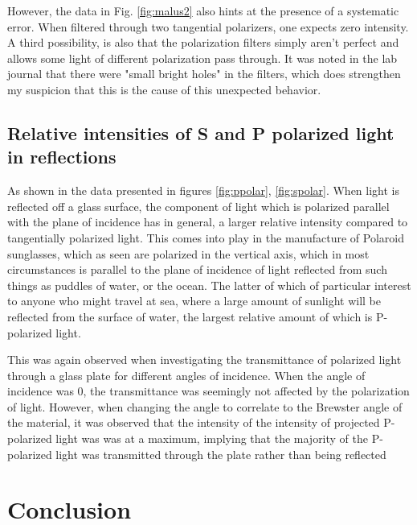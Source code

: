\documentclass[11pt,a4paper, twocolumn]{article}
\begin{document}
    However, the data in Fig. \ref{fig:malus2} also hints at the presence of a systematic error. When filtered through two tangential polarizers, one expects zero intensity. A third possibility, is also that the polarization filters simply aren't perfect and allows some light of different polarization pass through. It was noted in the lab journal that there were "small bright holes" in the filters, which does strengthen my suspicion that this is the cause of this unexpected behavior.

  \subsection{Relative intensities of S and P polarized light in reflections}
    As shown in the data presented in figures \ref{fig:ppolar}, \ref{fig:spolar}. When light is reflected off a glass surface, the component of light which is polarized parallel with the plane of incidence has in general, a larger relative intensity compared to tangentially polarized light. This comes into play in the manufacture of Polaroid sunglasses, which as seen are polarized in the vertical axis, which in most circumstances is parallel to the plane of incidence of light reflected from such things as puddles of water, or the ocean. The latter of which of particular interest to anyone who might travel at sea, where a large amount of sunlight will be reflected from the surface of water, the largest relative amount of which is P-polarized light.

    This was again observed when investigating the transmittance of polarized light through a glass plate for different angles of incidence. When the angle of incidence was 0, the transmittance was seemingly not affected by the polarization of light. However, when changing the angle to correlate to the Brewster angle of the material, it was observed that the intensity of the intensity of projected P-polarized light was was at a maximum, implying that the majority of the P-polarized light was transmitted through the plate rather than being reflected


\section{\label{sect:conclusion}Conclusion}

\onecolumn




\end{document}
